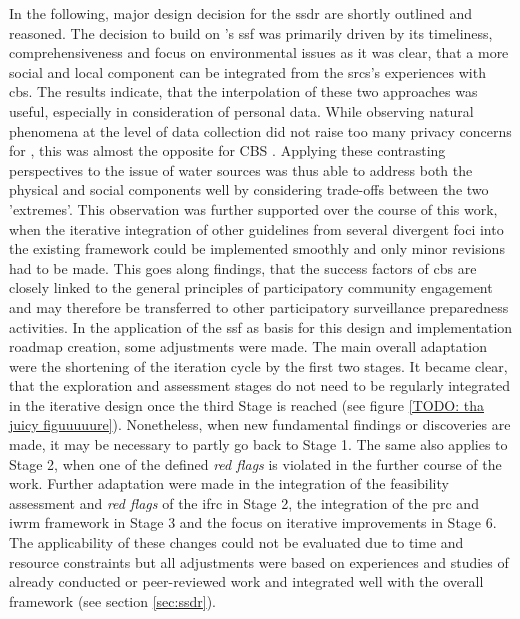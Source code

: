 In the following, major design decision for the \acrshort{ssdr} are shortly outlined and reasoned. The decision to build on \autocite{fraislCitizenScienceEnvironmental2022}'s \acrlong{ssf} was primarily driven by its timeliness, comprehensiveness and focus on environmental issues as it was clear, that a more social and local component can be integrated from the \acrshort{srcs}'s experiences with \acrshort{cbs}. The results indicate, that the interpolation of these two approaches was useful, especially in consideration of personal data. While observing natural phenomena at the level of data collection did not raise too many privacy concerns for \autocite{fraislCitizenScienceEnvironmental2022}, this was almost the opposite for CBS \autocite{ifrcCommunityBasedSurveillanceGuiding2017}. Applying these contrasting perspectives to the issue of water sources was thus able to address both the physical and social components well by considering trade-offs between the two 'extremes'. This observation was further supported over the course of this work, when the iterative integration of other guidelines from several divergent foci into the existing framework could be implemented smoothly and only minor revisions had to be made. This goes along \autocite{mcgowanCommunitybasedSurveillanceInfectious2022} findings, that the success factors of \acrshort{cbs} are closely linked to the general principles of participatory community engagement and may therefore be transferred to other participatory surveillance preparedness activities.\newline
In the application of the \acrshort{ssf} as basis for this design and implementation roadmap creation, some adjustments were made. The main overall adaptation were the shortening of the iteration cycle by the first two stages. It became clear, that the exploration and assessment stages do not need to be regularly integrated in the iterative design once the third Stage is reached (see figure \ref{TODO: tha juicy figuuuuure}). Nonetheless, when new fundamental findings or discoveries are made, it may be necessary to partly go back to Stage 1. The same also applies to Stage 2, when one of the defined \textit{red flags} is violated in the further course of the work. Further adaptation were made in the integration of the feasibility assessment and \textit{red flags} of the \acrshort{ifrc} in Stage 2, the integration of the \acrshort{prc} and \acrshort{iwrm} framework in Stage 3 and the focus on iterative improvements in Stage 6. The applicability of these changes could not be evaluated due to time and resource constraints but all adjustments were based on experiences and studies of already conducted or peer-reviewed work and integrated well with the overall framework (see section \ref{sec:ssdr}).\newline

